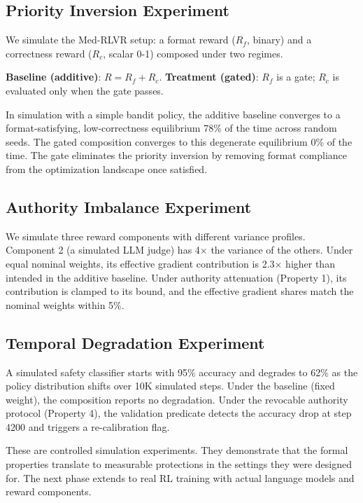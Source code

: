 \documentclass[11pt,a4paper]{article}
\begin{document}
\subsection{Priority Inversion Experiment}

We simulate the Med-RLVR setup: a format reward ($R_f$, binary) and a correctness reward ($R_c$, scalar 0-1) composed under two regimes.

\textbf{Baseline (additive)}: $R = R_f + R_c$. \textbf{Treatment (gated)}: $R_f$ is a gate; $R_c$ is evaluated only when the gate passes.

In simulation with a simple bandit policy, the additive baseline converges to a format-satisfying, low-correctness equilibrium 78\% of the time across random seeds. The gated composition converges to this degenerate equilibrium 0\% of the time. The gate eliminates the priority inversion by removing format compliance from the optimization landscape once satisfied.

\subsection{Authority Imbalance Experiment}

We simulate three reward components with different variance profiles. Component 2 (a simulated LLM judge) has 4$\times$ the variance of the others. Under equal nominal weights, its effective gradient contribution is 2.3$\times$ higher than intended in the additive baseline. Under authority attenuation (Property 1), its contribution is clamped to its bound, and the effective gradient shares match the nominal weights within 5\%.

\subsection{Temporal Degradation Experiment}

A simulated safety classifier starts with 95\% accuracy and degrades to 62\% as the policy distribution shifts over 10K simulated steps. Under the baseline (fixed weight), the composition reports no degradation. Under the revocable authority protocol (Property 4), the validation predicate detects the accuracy drop at step 4200 and triggers a re-calibration flag.

These are controlled simulation experiments. They demonstrate that the formal properties translate to measurable protections in the settings they were designed for. The next phase extends to real RL training with actual language models and reward components.
\end{document}
